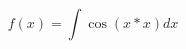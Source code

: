 \documentclass[preview]{standalone}
\begin{document}
\begin{equation}
  f(x)=\int  \cos(x*x) d x
\end{equation}
\end{document}

